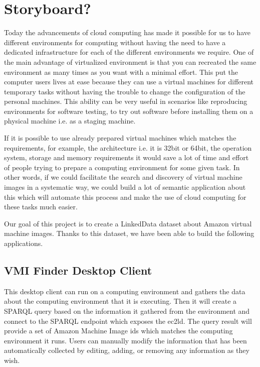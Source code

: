 \section{Storyboard?}

Today the advancements of cloud computing has made it possible for us to have different environments for computing without having the need to have a dedicated infrastructure for each of the different environments we require.  One of the main advantage of virtualized environment is that you can recreated the same environment as many times as you want with a minimal effort. This put the computer users lives at ease because they can use a virtual machines for different temporary tasks without having the trouble to change the configuration of the personal machines. This ability can be very useful in scenarios like reproducing environments for software testing, to try out software before installing them on a physical machine i.e. as a staging machine. 

If it is possible to use already prepared virtual machines which matches the requirements, for example, the architecture i.e. it is 32bit or 64bit, the operation system, storage and memory requirements it would save a lot of time and effort of people trying to prepare a computing environment for some given task. In other words, if we could facilitate the search and discovery of virtual machine images in a systematic way, we could build a lot of semantic application about this which will automate this process and make the use of cloud computing for these tasks much easier. 

Our goal of this project is to create a LinkedData dataset about Amazon virtual machine images. Thanks to this dataset, we have been able to build the following applications.

\subsection{VMI Finder Desktop Client}
This desktop client can run on a computing environment and gathers the data about the computing environment that it is executing. Then it will create a SPARQL query based on the information it gathered from the environment and connect to the SPARQL endpoint which exposes the ec2ld. The query result will provide a set of Amazon Machine Image ids which matches the computing environment it runs.  Users can manually modify the information that has been automatically collected by editing, adding, or removing any information as they wish.  

